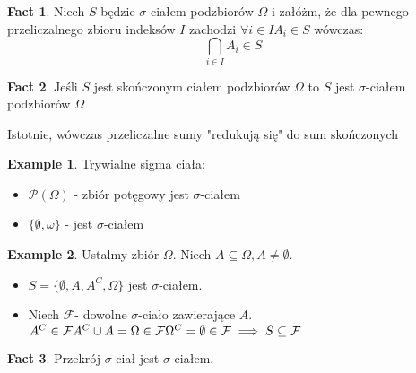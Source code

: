 \documentclass{article}
\theoremstyle{definition}
\theoremstyle{definition}
\theoremstyle{definition}
\newtheorem{pk}{Example}[subsection]
\theoremstyle{definition}
\newtheorem{fakt}{Fact}
\begin{document}
\begin{fakt}
    Niech \(S\) będzie $\sigma$-ciałem podzbiorów $\Omega$ i załóżm, że dla pewnego przeliczalnego zbioru indeksów $I$ zachodzi \(\forall i\in I A_i \in S\) wówczas:
    \[\bigcap_{i\in I} A_i \in S\]
\end{fakt}

\begin{fakt}
    Jeśli $S$ jest skończonym ciałem podzbiorów $\Omega$ to $S$ jest $\sigma$-ciałem podzbiorów $\Omega$
\end{fakt}

Istotnie, wówczas przeliczalne sumy "redukują się" do sum skończonych

\begin{pk}
    Trywialne sigma ciała:
    \begin{itemize}
        \item \(\mathcal{P}(\Omega)\) - zbiór potęgowy jest $\sigma$-ciałem
        \item \(\{\emptyset, \omega\}\) - jest $\sigma$-ciałem
    \end{itemize}
\end{pk}

\begin{pk}
    Ustalmy zbiór $\Omega$. Niech $A\subseteq \Omega, A \neq \emptyset$.
    \begin{itemize}
        \item \(S=\{\emptyset, A, A^C, \Omega\}\) jest $\sigma$-ciałem.
        \item Niech $\mathcal{F}$- dowolne $\sigma$-ciało zawierające $A$.\\
        \(A^C \in \mathcal{F}\\
        A^C\cup A = \Omega \in \mathcal{F}\\
        \Omega^C=\emptyset\in\mathcal{F} \implies S\subseteq \mathcal{F}\)
    \end{itemize} 
\end{pk}

\begin{fakt}
    Przekrój $\sigma$-ciał jest $\sigma$-ciałem.
\end{fakt}
\end{document}
